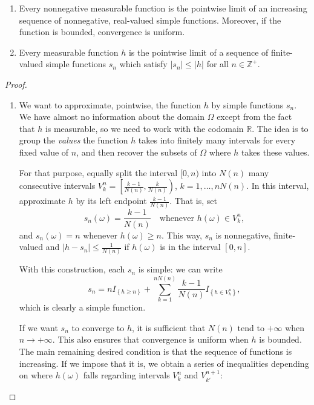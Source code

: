 \begin{thrm} \label{theorem:approximation of measurable by simple}
	\begin{enumerate}
		\item  Every nonnegative measurable function is the pointwise limit of
an increasing sequence of nonnegative, real-valued simple functions. Moreover,
if the function is bounded, convergence is uniform.
		\item Every measurable function \(h\) is the pointwise limit of a
sequence of finite-valued simple functions \(s_n\) which satisfy
\(|s_n|\leq|h|\) for all \(n\in\mathbb{Z}^+\).
	\end{enumerate}
\end{thrm}
\begin{proof}
	\begin{enumerate}
		\item We want to approximate, pointwise, the function \(h\) by simple functions \(s_n\). We have almost no information about the domain \(\Omega\) except from the fact that \(h\) is measurable, so we need to work with the codomain \(\mathbb{R}\). The idea is to group the \emph{values} the function \(h\) takes into finitely many intervals for every fixed value of \(n\), and then recover the subsets of \(\Omega\) where \(h\) takes these values.

For that purpose, equally split the interval \([0,n)\) into \(N(n)\) many consecutive intervals 
\(V_k^n=\left[\frac{k-1}{N(n)},\frac {k}{N(n)}\right)\), \(k=1,\dots,nN(n)\). In
this interval, approximate \(h\) by its left endpoint \(\frac{k-1}{N(n)}\). That
is, set
		\[s_n(\omega)=\frac{k-1}{N(n)} \text{ ~~whenever } h(\omega)\in V_k^n,\]
and \(s_n(\omega)=n\) whenever \(h(\omega)\geq n\). This way, \(s_n\) is
nonnegative, finite-valued and \(|h-s_n|\leq \frac{1}{N(n)}\) if \(h(\omega)\)
is in the interval \([0,n]\).
		
		With this construction, each \(s_n\) is simple: we can write
		\[s_n=nI_{\left\{h\geq n\right\}}+\sum_{k=1}^{nN(n)}\frac{k-1}{N(n)}I_{\left\{h\in V^n_k\right\}},\]
which is clearly a simple function.
		
		If we want \(s_n\) to converge to \(h\), it is sufficient that \(N(n)\)
tend to \(+\infty\) when \(n\to+\infty\). This also ensures that convergence is
uniform when \(h\) is bounded. The main remaining desired condition is that the
sequence of functions is increasing. If we impose that it is, we obtain a series
of inequalities depending on where \(h(\omega)\) falls regarding intervals
\(V_k^n\) and \(V_{k'}^{n+1}\):
		

\end{enumerate}
\end{proof}
